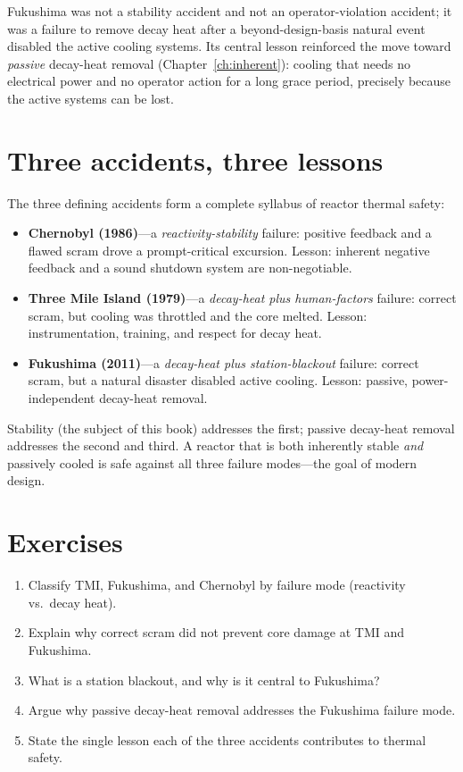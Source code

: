 Fukushima was not a stability accident and not an operator-violation accident; it
was a failure to remove decay heat after a beyond-design-basis natural event
disabled the active cooling systems. Its central lesson reinforced the move toward
\emph{passive} decay-heat removal (Chapter~\ref{ch:inherent}): cooling that needs
no electrical power and no operator action for a long grace period, precisely
because the active systems can be lost.

\section{Three accidents, three lessons}

The three defining accidents form a complete syllabus of reactor thermal safety:
\begin{itemize}[nosep]
\item \textbf{Chernobyl (1986)}---a \emph{reactivity-stability} failure: positive
feedback and a flawed scram drove a prompt-critical excursion. Lesson: inherent
negative feedback and a sound shutdown system are non-negotiable.
\item \textbf{Three Mile Island (1979)}---a \emph{decay-heat plus human-factors}
failure: correct scram, but cooling was throttled and the core melted. Lesson:
instrumentation, training, and respect for decay heat.
\item \textbf{Fukushima (2011)}---a \emph{decay-heat plus station-blackout}
failure: correct scram, but a natural disaster disabled active cooling. Lesson:
passive, power-independent decay-heat removal.
\end{itemize}
Stability (the subject of this book) addresses the first; passive decay-heat
removal addresses the second and third. A reactor that is both inherently stable
\emph{and} passively cooled is safe against all three failure modes---the goal of
modern design.


\section*{Exercises}
\begin{enumerate}[leftmargin=*,itemsep=2pt]
\item Classify TMI, Fukushima, and Chernobyl by failure mode (reactivity vs.\ decay heat).
\item Explain why correct scram did not prevent core damage at TMI and Fukushima.
\item What is a station blackout, and why is it central to Fukushima?
\item Argue why passive decay-heat removal addresses the Fukushima failure mode.
\item State the single lesson each of the three accidents contributes to thermal safety.
\end{enumerate}
